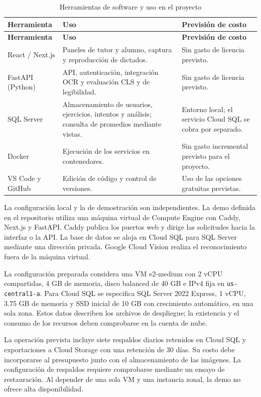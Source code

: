 \begin{longtable}{|p{3.5cm}|p{7.7cm}|p{3.4cm}|}
\caption{Herramientas de software y uso en el proyecto}
\label{tab:software} \\ \hline
\textbf{Herramienta} & \textbf{Uso} & \textbf{Previsión de costo} \\ \hline
\endfirsthead
\hline
\textbf{Herramienta} & \textbf{Uso} & \textbf{Previsión de costo} \\ \hline
\endhead
React / Next.js \cite{reactDocs,nextjsDocs} & Paneles de tutor y alumno, captura y reproducción de dictados. & Sin gasto de licencia previsto. \\ \hline
FastAPI (Python) \cite{fastapiDocs} & API, autenticación, integración OCR y evaluación CLS y de legibilidad. & Sin gasto de licencia previsto. \\ \hline
SQL Server & Almacenamiento de usuarios, ejercicios, intentos y análisis; consulta de promedios mediante vistas. & Entorno local; el servicio Cloud SQL se cobra por separado. \\ \hline
Docker \cite{dockerDocs} & Ejecución de los servicios en contenedores. & Sin gasto incremental previsto para el proyecto. \\ \hline
VS Code y GitHub \cite{vscodeDocs,githubDocs} & Edición de código y control de versiones. & Uso de las opciones gratuitas previstas. \\ \hline
\end{longtable}

La configuración local y la de demostración son independientes. La demo definida en el repositorio utiliza una máquina virtual de Compute Engine con Caddy, Next.js y FastAPI. Caddy publica los puertos web y dirige las solicitudes hacia la interfaz o la API. La base de datos se aloja en Cloud SQL para SQL Server mediante una dirección privada. Google Cloud Vision realiza el reconocimiento fuera de la máquina virtual.

La configuración preparada considera una VM e2-medium con 2 vCPU compartidas, 4 GB de memoria, disco balanced de 40 GB e IPv4 fija en \texttt{us-central1-a}. Para Cloud SQL se especifica SQL Server 2022 Express, 1 vCPU, 3.75 GB de memoria y SSD inicial de 10 GB con crecimiento automático, en una sola zona. Estos datos describen los archivos de despliegue; la existencia y el consumo de los recursos deben comprobarse en la cuenta de nube.

La operación prevista incluye siete respaldos diarios retenidos en Cloud SQL y exportaciones a Cloud Storage con una retención de 30 días. Su costo debe incorporarse al presupuesto junto con el almacenamiento de las imágenes. La configuración de respaldos requiere comprobarse mediante un ensayo de restauración. Al depender de una sola VM y una instancia zonal, la demo no ofrece alta disponibilidad.

